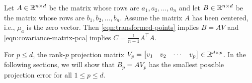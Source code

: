 Let \(A \in \mathbb{R}^{n \times d}\) be the matrix whose rows are \(a_1, a_2, \dots, a_n\) and
let \(B \in \mathbb{R}^{n \times d}\) be the matrix whose rows are \(b_1, b_2, \dots, b_n\).
Assume the matrix \(A\) has been centered, i.e., \(\mu_a\) is the zero vector.
Then \cref{eqn:transformed-points} implies \(B = AV\) and \cref{eqn:covariance-matrix-pca} implies \(C = \frac{1}{n-1} A^\top A\).

For \(p \leq d\), the rank-\(p\) projection matrix \(V_p = \begin{bmatrix}
    v_1 & v_2 & \cdots & v_p
\end{bmatrix} \in \mathbb{R}^{d \times p}\).
In the following sections, we will show that \(B_p = A V_p\) has the smallest possible projection error for all \(1 \leq p \leq d\).

